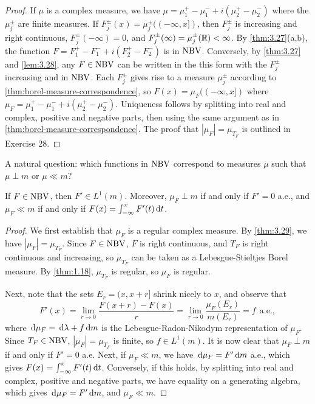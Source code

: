 \documentclass[12pt]{article} %
\begin{document}
\begin{proof}
    If $\mu$ is a complex measure, we have $\mu = \mu_1^+ - \mu_1^- + i(\mu_2^+ - \mu_2^-)$ where the $\mu_j^{\pm}$ are finite measures. If $F_j^\pm(x) = \mu_j^\pm((-\infty, x])$, then $F_j^\pm$ is increasing and right continuous, $F_j^{\pm}(-\infty) = 0$, and $F_j^{\pm}(\infty) = \mu_j^{\pm}(\mathbb{R}) < \infty$. By \cref{thm:3.27}(a,b), the function $F = F_1^+ - F_1^- + i(F_2^+ - F_2^-)$ is in $\operatorname{NBV}$. Conversely, by \cref{thm:3.27} and \cref{lem:3.28}, any $F \in \operatorname{NBV}$ can be written in the this form with the $F_j^{\pm}$ increasing and in $\operatorname{NBV}$. Each $F_j^{\pm}$ gives rise to a measure $\mu_j^{\pm}$ according to \cref{thm:borel-measure-correspondence}, so $F(x) = \mu_F((-\infty, x])$ where $\mu_F = \mu_1^{+} - \mu_1^- + i(\mu_2^+ - \mu_2^-)$. Uniqueness follows by splitting into real and complex, positive and negative parts, then using the same argument as in \cref{thm:borel-measure-correspondence}. The proof that $|\mu_F| = \mu_{T_F}$ is outlined in Exercise 28.
\end{proof}

A natural question: which functions in $\operatorname{NBV}$ correspond to measures $\mu$ such that $\mu \perp m$ or $\mu \ll m$?

\begin{proposition}\label{prop:3.30}
    If $F \in \operatorname{NBV}$, then $F' \in L^1(m)$. Moreover, $\mu_F \perp m$ if and only if $F' = 0$ a.e., and $\mu_F \ll m$ if and only if $F(x) = \int_{-\infty}^x F'(t) \, \mathrm{d} t$.
\end{proposition}

\begin{proof}
    We first establish that $\mu_F$ is a regular complex measure. By \cref{thm:3.29}, we have $|\mu_F| = \mu_{T_F}$. Since $F \in \operatorname{NBV}$, $F$ is right continuous, and $T_F$ is right continuous and increasing, so $\mu_{T_F}$ can be taken as a Lebesgue-Stieltjes Borel measure. By \cref{thm:1.18}, $\mu_{T_F}$ is regular, so $\mu_F$ is regular. 

    Next, note that the sets $E_r = (x, x + r]$ shrink nicely to $x$, and observe that \[F'(x) = \lim_{r\to 0} \frac{F(x + r) - F(x)}{r} = \lim_{r \to 0} \frac{\mu_F(E_r)}{m(E_r)} = f \ \ \text{a.e.},\] where $\, \mathrm{d}\mu_F = \, \mathrm{d} \lambda + f \, \mathrm{d} m$ is the Lebesgue-Radon-Nikodym representation of $\mu_F$. Since $T_F \in \operatorname{NBV}$, $|\mu_F| = \mu_{T_F}$ is finite, so $f \in L^1(m)$. It is now clear that $\mu_F \perp m$ if and only if $F' = 0$ a.e. Next, if $\mu_F \ll m$, we have $\, \mathrm{d}\mu_F = F' \, \mathrm{d} m$ a.e., which gives $F(x) = \int_{-\infty}^x F'(t) \, \mathrm{d} t$. Conversely, if this holds, by splitting into real and complex, positive and negative parts, we have equality on a generating algebra, which gives $\, \mathrm{d} \mu_F = F' \, \mathrm{d} m$, and $\mu_F \ll m$.
\end{proof}
\end{document}

